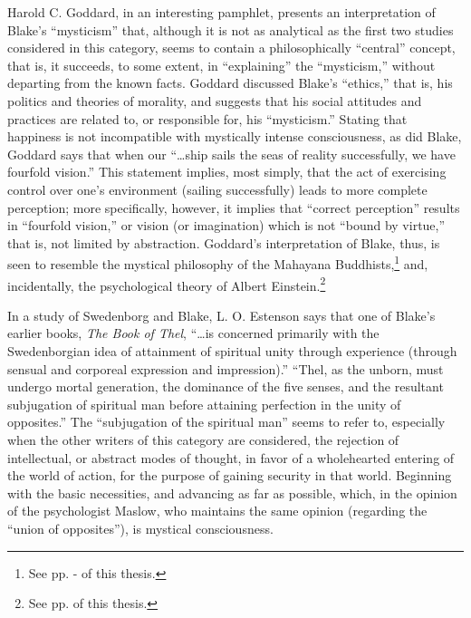 Harold C. Goddard, in an interesting pamphlet,\supercite{goddard:fourfold-vision}
presents an interpretation of Blake's \enquote{mysticism} that, although it is not as analytical as the first two studies considered
in this category, seems to contain a philosophically \enquote{central} concept,
that is, it succeeds, to some extent, in \enquote{explaining} the \enquote{mysticism,} without departing from
the known facts. Goddard discussed Blake's \enquote{ethics,} that is, his politics
and theories of morality, and suggests that his social attitudes and practices
are related to, or responsible for, his \enquote{mysticism.} Stating that happiness is not incompatible
with mystically intense consciousness, as did Blake, Goddard says that when our \enquote{\dots ship
sails the seas of reality successfully, we have fourfold vision.}\supercite{goddard:fourfold-vision}
This statement implies, most simply, that the act of exercising control over one's environment (sailing successfully) leads
to more complete perception; more specifically, however, it implies that
\enquote{correct perception} results in \enquote{fourfold vision,} or vision (or imagination)
which is not \enquote{bound by virtue,} that is, not limited by abstraction. Goddard's
interpretation of Blake, thus, is seen to resemble the mystical philosophy of
the Mahayana Buddhists,\footnote{See pp. \pageref{self:17}-\pageref{self:18} of this thesis.}
and, incidentally, the psychological theory of Albert Einstein.\footnote{See pp. \pageref{self:19} of this thesis.}

In a study of Swedenborg and Blake,\supercite{estenson:swedenborg-and-blake}
L. O. Estenson says that one of Blake's earlier books,
\emph{The Book of Thel}, \enquote{\dots is concerned primarily with the Swedenborgian idea of attainment of
spiritual unity through experience (through sensual and corporeal expression and impression).}\supercite{estenson:swedenborg-and-blake}
\enquote{Thel, as the unborn, must undergo mortal generation, the dominance of the five senses, and the resultant
subjugation of spiritual man before attaining perfection in the unity of opposites.}\supercite{estenson:swedenborg-and-blake}
The \enquote{subjugation of the spiritual man} seems to refer to, especially when the other
writers of this category are considered, the rejection of intellectual, or abstract modes of
thought, in favor of a wholehearted entering of the world of action, for the purpose
of gaining security in that world. Beginning with the basic necessities, and advancing as far
as possible, which, in the opinion of the psychologist Maslow, who maintains the same opinion (regarding the
\enquote{union of opposites}), is mystical consciousness.

